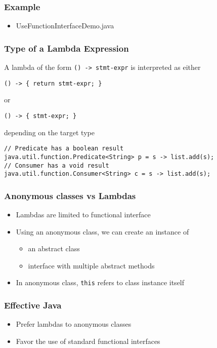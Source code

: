 \documentclass{beamer}
\begin{document}
\begin{frame}[fragile]
\frametitle{Example}

\begin{itemize}
  \item <1-> UseFunctionInterfaceDemo.java
\end{itemize}


\end{frame}



\begin{frame}[fragile]
\frametitle{Type of a Lambda Expression}

A lambda of the form \texttt{() -> stmt-expr} is interpreted as either
\begin{lstlisting} 
() -> { return stmt-expr; }
\end{lstlisting}
or
\begin{lstlisting} 
() -> { stmt-expr; }  
\end{lstlisting}
depending on the target type


\begin {example}
\begin{lstlisting}
// Predicate has a boolean result
java.util.function.Predicate<String> p = s -> list.add(s);
// Consumer has a void result
java.util.function.Consumer<String> c = s -> list.add(s);
\end{lstlisting}
\end{example}

\end{frame}


\begin{frame}[fragile]
\frametitle{Anonymous classes vs Lambdas}

\begin{itemize}
\item <1-> Lambdas are limited to functional interface
\item <2-> Using an anonymous class, we can create an instance of
  \begin{itemize}
  \item an abstract class
  \item interface with multiple abstract methods
  \end{itemize}
\item <3-> In anonymous class, \texttt{this} refers to class instance itself
\end{itemize}

\end{frame}


\begin{frame}[fragile]
\frametitle{Effective Java }

\begin{itemize}
\item <1-> Prefer lambdas to anonymous	classes
\item <2-> Favor the use of standard functional interfaces
\end{itemize}

\end{frame}
\end{document}
